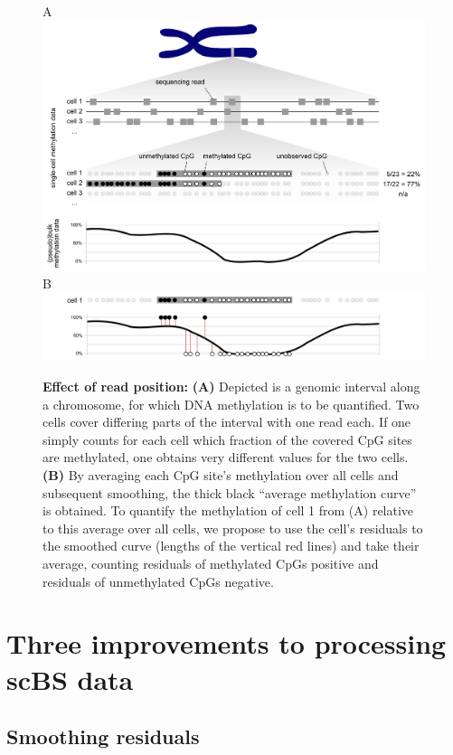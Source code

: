 \documentclass[twocolumn,10pt]{article}
\begin{document}
\begin{figure}
	A\\ 
	\includegraphics[width=\columnwidth]{figures/Fig_residuals_A.png}
	B\\
	\includegraphics[width=\columnwidth]{figures/Fig_residuals_B.png}
\caption{\small \textbf{Effect of read position:} \textbf{(A)} Depicted is a genomic interval along a chromosome, for which DNA methylation is to be quantified. Two cells cover differing parts of the interval with one read each. If one simply counts for each cell which fraction of the covered CpG sites are methylated, one obtains very different values for the two cells. \textbf{(B)} By averaging each CpG site's methylation over all cells and subsequent smoothing, the thick black ``average methylation curve'' is obtained. To quantify the methylation of cell 1 from (A) relative to this average over all cells, we propose to use the cell's residuals to the smoothed curve (lengths of the vertical red lines) and take their average, counting residuals of methylated CpGs positive and residuals of unmethylated CpGs negative.}
\label{smoothres}
\end{figure}

\section{Three improvements to processing scBS data}

\subsection{Smoothing residuals} \label{residuals}
\end{document}
